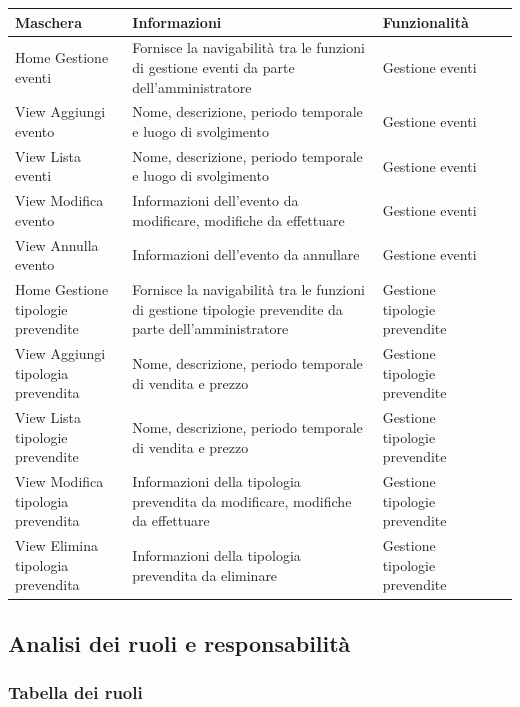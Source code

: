 \documentclass[a4paper]{article}
\begin{document}
\begin{center}
    \begin{tabularx}{1\textwidth}{|X|X|X|X|}
    \hline
    \textbf{Maschera} & \textbf{Informazioni} & \textbf{Funzionalità}\\
    \hline
    \hline
    Home Gestione eventi & Fornisce la navigabilità tra le funzioni di gestione eventi da parte dell'amministratore & Gestione eventi \\
    \hline
    View Aggiungi evento & Nome, descrizione, periodo temporale e luogo di svolgimento & Gestione eventi\\
    \hline
    View Lista eventi & Nome, descrizione, periodo temporale e luogo di svolgimento & Gestione eventi\\
    \hline
    View Modifica evento & Informazioni dell'evento da modificare, modifiche da effettuare & Gestione eventi\\
    \hline
    View Annulla evento & Informazioni dell'evento da annullare & Gestione eventi\\
    \hline
    Home Gestione tipologie prevendite & Fornisce la navigabilità tra le funzioni di gestione tipologie prevendite da parte dell'amministratore & Gestione tipologie prevendite \\
    \hline
    View Aggiungi tipologia prevendita & Nome, descrizione, periodo temporale di vendita e prezzo & Gestione tipologie prevendite\\
    \hline
    View Lista tipologie prevendite & Nome, descrizione, periodo temporale di vendita e prezzo & Gestione tipologie prevendite\\
    \hline
    View Modifica tipologia prevendita & Informazioni della tipologia prevendita da modificare, modifiche da effettuare & Gestione tipologie prevendite\\
    \hline
    View Elimina tipologia prevendita & Informazioni della tipologia prevendita da eliminare & Gestione tipologie prevendite\\
    \hline
    \end{tabularx}
\end{center}

\newpage

\subsection{Analisi dei ruoli e responsabilità}
\subsubsection{Tabella dei ruoli}
\end{document}

